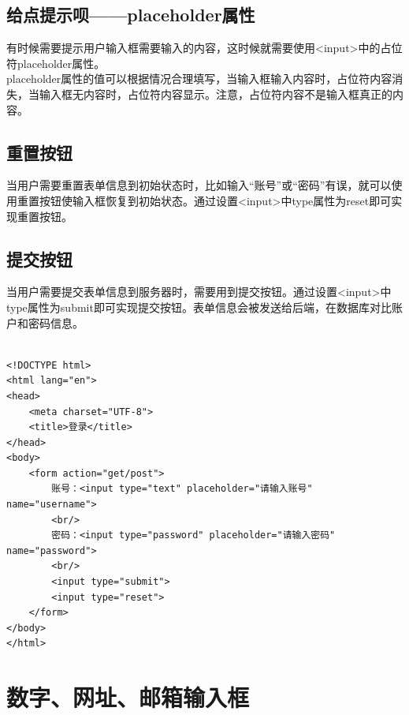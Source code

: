 \vspace{0.5cm}

\subsection{给点提示呗——placeholder属性}

有时候需要提示用户输入框需要输入的内容，这时候就需要使用<input>中的占位符placeholder属性。\\

placeholder属性的值可以根据情况合理填写，当输入框输入内容时，占位符内容消失，当输入框无内容时，占位符内容显示。注意，占位符内容不是输入框真正的内容。\\

\subsection{重置按钮}

当用户需要重置表单信息到初始状态时，比如输入“账号”或“密码”有误，就可以使用重置按钮使输入框恢复到初始状态。通过设置<input>中type属性为reset即可实现重置按钮。\\

\subsection{提交按钮}

当用户需要提交表单信息到服务器时，需要用到提交按钮。通过设置<input>中type属性为submit即可实现提交按钮。表单信息会被发送给后端，在数据库对比账户和密码信息。\\

\\

\begin{lstlisting}[style=htmlcssjs]
<!DOCTYPE html>
<html lang="en">
<head>
    <meta charset="UTF-8">
    <title>登录</title>
</head>
<body>
    <form action="get/post">
        账号：<input type="text" placeholder="请输入账号" name="username">
        <br/>
        密码：<input type="password" placeholder="请输入密码" name="password">
        <br/>
        <input type="submit">
        <input type="reset">
    </form>
</body>
</html>
\end{lstlisting}

\newpage

\section{数字、网址、邮箱输入框}

